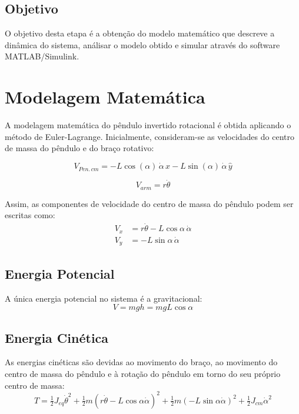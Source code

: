 \documentclass[9pt,a4paper,twocolumn,twoside]{tau-class/tau}
\begin{document}
\subsection{Objetivo}
O objetivo desta etapa é a obtenção do modelo matemático que descreve a dinâmica do sistema, 
análisar o modelo obtido e simular através do software MATLAB/Simulink.

\section{Modelagem Matemática}

A modelagem matemática do pêndulo invertido rotacional é obtida aplicando o 
método de Euler-Lagrange. Inicialmente, consideram-se as velocidades do 
centro de massa do pêndulo e do braço rotativo:

\begin{equation}
    V_{Pen.\,cm} = -L \cos (\alpha) \, \dot{\alpha} \, \hat{x} - L \sin (\alpha) \, \dot{\alpha} \, \hat{y}
\end{equation}

\begin{equation}
    V_{arm} = r \dot{\theta}
\end{equation}

Assim, as componentes de velocidade do centro de massa do pêndulo podem ser escritas como:
\begin{align}
    V_x &= r\dot{\theta} - L\cos\alpha \, \dot{\alpha} \\
    V_y &= -L\sin\alpha \, \dot{\alpha}
\end{align}

\subsection{Energia Potencial}
A única energia potencial no sistema é a gravitacional:
\begin{equation}
    V = m g h = m g L \cos \alpha
\end{equation}

\subsection{Energia Cinética}
As energias cinéticas são devidas ao movimento do braço, ao movimento do centro 
de massa do pêndulo e à rotação do pêndulo em torno do seu próprio centro de massa:
\begin{equation}
    T = \tfrac{1}{2} J_{eq} \dot{\theta}^2 
        + \tfrac{1}{2} m (r \dot{\theta} - L \cos\alpha \dot{\alpha})^2
        + \tfrac{1}{2} m (-L \sin\alpha \dot{\alpha})^2
        + \tfrac{1}{2} J_{cm} \dot{\alpha}^2
\end{equation}
\end{document}
